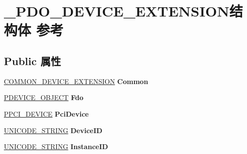 \hypertarget{struct___p_d_o___d_e_v_i_c_e___e_x_t_e_n_s_i_o_n}{}\section{\+\_\+\+P\+D\+O\+\_\+\+D\+E\+V\+I\+C\+E\+\_\+\+E\+X\+T\+E\+N\+S\+I\+O\+N结构体 参考}
\label{struct___p_d_o___d_e_v_i_c_e___e_x_t_e_n_s_i_o_n}
\subsection*{Public 属性}
\begin{DoxyCompactItemize}
\item 
\mbox{\label{struct___p_d_o___d_e_v_i_c_e___e_x_t_e_n_s_i_o_n_aa0392f98396b8ef9c86ce28a70452efd}} 
\hyperlink{struct_c_o_m_m_o_n___d_e_v_i_c_e___e_x_t_e_n_s_i_o_n}{C\+O\+M\+M\+O\+N\+\_\+\+D\+E\+V\+I\+C\+E\+\_\+\+E\+X\+T\+E\+N\+S\+I\+ON} {\bfseries Common}
\item 
\mbox{\label{struct___p_d_o___d_e_v_i_c_e___e_x_t_e_n_s_i_o_n_a420dca150a301c34cc57f6db06bcb636}} 
\hyperlink{struct___d_e_v_i_c_e___o_b_j_e_c_t}{P\+D\+E\+V\+I\+C\+E\+\_\+\+O\+B\+J\+E\+CT} {\bfseries Fdo}
\item 
\mbox{\label{struct___p_d_o___d_e_v_i_c_e___e_x_t_e_n_s_i_o_n_a63ee9f45e20633cb01d3fb08e9ed79d5}} 
\hyperlink{struct___p_c_i___d_e_v_i_c_e}{P\+P\+C\+I\+\_\+\+D\+E\+V\+I\+CE} {\bfseries Pci\+Device}
\item 
\mbox{\label{struct___p_d_o___d_e_v_i_c_e___e_x_t_e_n_s_i_o_n_a90af86357bbbf96cf806bc2c081dc6d5}} 
\hyperlink{struct___u_n_i_c_o_d_e___s_t_r_i_n_g}{U\+N\+I\+C\+O\+D\+E\+\_\+\+S\+T\+R\+I\+NG} {\bfseries Device\+ID}
\item 
\mbox{\label{struct___p_d_o___d_e_v_i_c_e___e_x_t_e_n_s_i_o_n_a7f793c849f4fca68453f7288b4b932de}} 
\hyperlink{struct___u_n_i_c_o_d_e___s_t_r_i_n_g}{U\+N\+I\+C\+O\+D\+E\+\_\+\+S\+T\+R\+I\+NG} {\bfseries Instance\+ID}
\item 

\end{DoxyCompactItemize}
